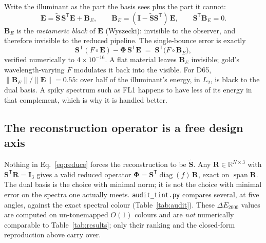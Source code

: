 \documentclass[11pt,a4paper]{article}
\newcommand{\mS}{\mathbf{S}}
\newcommand{\mSd}{\tilde{\mathbf{S}}}
\newcommand{\mR}{\mathbf{R}}
\newcommand{\mPhi}{\boldsymbol{\Phi}}
\newcommand{\mI}{\mathbf{I}}
\newcommand{\mB}{\mathbf{B}}
\newcommand{\vE}{\mathbf{E}}
\newcommand{\diag}{\operatorname{diag}}
\newcommand{\dE}{\Delta E_{2000}}
\newcommand{\transp}{^{\mathsf{T}}}
\newcommand{\file}[1]{\texttt{#1}}
\begin{document}
Write the illuminant as the part the basis sees plus the part it cannot:
\begin{equation}
  \vE=\mSd\,\mS\transp\vE+\mB_E,\qquad
  \mB_E=(\mI-\mSd\mS\transp)\,\vE,\qquad \mS\transp\mB_E=0 .
\end{equation}
$\mB_E$ is the \emph{metameric black} of $\vE$ (Wyszecki): invisible to the
observer, and therefore invisible to the reduced pipeline.  The single-bounce
error is exactly
\begin{equation}
  \mS\transp(F\circ\vE)-\mPhi\,\mS\transp\vE
  \;=\;\mS\transp\big(F\circ\mB_E\big),
  \label{eq:black}
\end{equation}
verified numerically to $4\times10^{-16}$.  A flat material leaves $\mB_E$
invisible; gold's wavelength-varying $F$ modulates it back into the visible.
For D65, $\|\mB_E\|/\|\vE\|=0.55$: over half of the illuminant's energy, in
$L_2$, is black to the dual basis.  A spiky spectrum such as FL1 happens to
have less of its energy in that complement, which is why it is handled better.

\subsection{The reconstruction operator is a free design axis}

Nothing in Eq.~\eqref{eq:reduce} forces the reconstruction to be $\mSd$.  Any
$\mR\in\mathbb{R}^{N\times3}$ with $\mS\transp\mR=\mI_3$ gives a valid reduced
operator $\mPhi=\mS\transp\diag(f)\,\mR$, exact on $\operatorname{span}\mR$.
The dual basis is the choice with minimal norm; it is not the choice with
minimal error on the spectra one actually meets.  \file{audit\_tint.py}
compares several, at five angles, against the exact spectral colour
(Table~\ref{tab:audit}).  These $\dE$ values are computed on un-tonemapped
$O(1)$ colours and are \emph{not} numerically comparable to
Table~\ref{tab:results}; only their ranking and the closed-form reproduction
above carry over.
\end{document}
